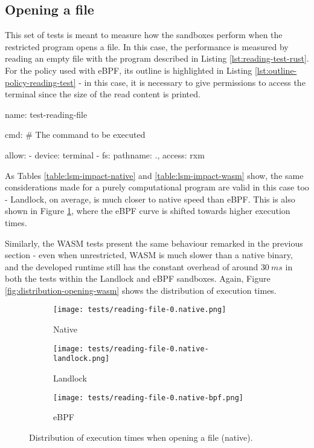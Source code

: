 \subsection{Opening a file}

This set of tests is meant to measure how the sandboxes perform when the restricted program opens a file.
In this case, the performance is measured by reading an empty file with the program described in Listing \ref{lst:reading-test-rust}.
For the policy used with eBPF, its outline is highlighted in Listing \ref{lst:outline-policy-reading-test}
- in this case, it is necessary to give permissions to access the terminal since the size of the read content is printed. 

\vspace*{0.5cm}
\begin{code}[language=yaml, caption=The outline of the policy used for testing the reading program., label=lst:outline-policy-reading-test]
name: test-reading-file

cmd: # The command to be executed

allow:
  - device: terminal
  - fs: {pathname: ., access: rxm}
\end{code}

As Tables \ref{table:lsm-impact-native} and \ref{table:lsm-impact-wasm} show,
the same considerations made for a purely computational program are valid in this case too
- Landlock, on average, is much closer to native speed than eBPF.
This is also shown in Figure \ref{fig:distribution-opening-native}, where the eBPF curve is shifted towards
higher execution times.

Similarly, the WASM tests present the same behaviour remarked in the previous section -
even when unrestricted, WASM is much slower than a native binary, and the developed runtime
still has the constant overhead of around $30\ ms$ in both the tests within the Landlock and eBPF sandboxes.
Again, Figure \ref{fig:distribution-opening-wasm} shows the distribution of execution times.

\begin{figure}[ht]
  \centering
  \begin{subfigure}[b]{0.32\textwidth}
    \centering
    \texttt{[image: tests/reading-file-0.native.png]}
    \caption{Native}
  \end{subfigure}
  \begin{subfigure}[b]{0.32\textwidth}
    \centering
    \texttt{[image: tests/reading-file-0.native-landlock.png]}
    \caption{Landlock}
  \end{subfigure}
  \begin{subfigure}[b]{0.32\textwidth}
    \centering
    \texttt{[image: tests/reading-file-0.native-bpf.png]}
    \caption{eBPF}
  \end{subfigure}
  \caption{Distribution of execution times when opening a file (native).}
  \label{fig:distribution-opening-native}
\end{figure}

